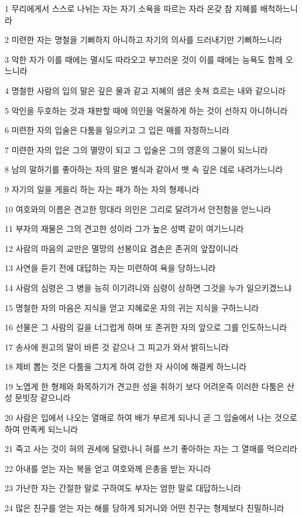 \par 1 무리에게서 스스로 나뉘는 자는 자기 소욕을 따르는 자라 온갖 참 지혜를 배척하느니라
\par 2 미련한 자는 명철을 기뻐하지 아니하고 자기의 의사를 드러내기만 기뻐하느니라
\par 3 악한 자가 이를 때에는 멸시도 따라오고 부끄러운 것이 이를 때에는 능욕도 함께 오느니라
\par 4 명철한 사람의 입의 말은 깊은 물과 같고 지혜의 샘은 솟쳐 흐르는 내와 같으니라
\par 5 악인을 두호하는 것과 재판할 때에 의인을 억울하게 하는 것이 선하지 아니하니라
\par 6 미련한 자의 입술은 다툼을 일으키고 그 입은 매를 자청하느니라
\par 7 미련한 자의 입은 그의 멸망이 되고 그 입술은 그의 영혼의 그물이 되느니라
\par 8 남의 말하기를 좋아하는 자의 말은 별식과 같아서 뱃 속 깊은 데로 내려가느니라
\par 9 자기의 일을 게을리 하는 자는 패가 하는 자의 형제니라
\par 10 여호와의 이름은 견고한 망대라 의인은 그리로 달려가서 안전함을 얻느니라
\par 11 부자의 재물은 그의 견고한 성이라 그가 높은 성벽 같이 여기느니라
\par 12 사람의 마음의 교만은 멸망의 선봉이요 겸손은 존귀의 앞잡이니라
\par 13 사연을 듣기 전에 대답하는 자는 미련하여 욕을 당하느니라
\par 14 사람의 심령은 그 병을 능히 이기려니와 심령이 상하면 그것을 누가 일으키겠느냐
\par 15 명철한 자의 마음은 지식을 얻고 지혜로운 자의 귀는 지식을 구하느니라
\par 16 선물은 그 사람의 길을 너그럽게 하며 또 존귀한 자의 앞으로 그를 인도하느니라
\par 17 송사에 원고의 말이 바른 것 같으나 그 피고가 와서 밝히느니라
\par 18 제비 뽑는 것은 다툼을 그치게 하여 강한 자 사이에 해결케 하느니라
\par 19 노엽게 한 형제와 화목하기가 견고한 성을 취하기 보다 어려운즉 이러한 다툼은 산성 문빗장 같으니라
\par 20 사람은 입에서 나오는 열매로 하여 배가 부르게 되나니 곧 그 입술에서 나는 것으로하여 만족케 되느니라
\par 21 죽고 사는 것이 혀의 권세에 달렸나니 혀를 쓰기 좋아하는 자는 그 열매를 먹으리라
\par 22 아내를 얻는 자는 복을 얻고 여호와께 은총을 받는 자니라
\par 23 가난한 자는 간절한 말로 구하여도 부자는 엄한 말로 대답하느니라
\par 24 많은 친구를 얻는 자는 해를 당하게 되거니와 어떤 친구는 형제보다 친밀하니라

